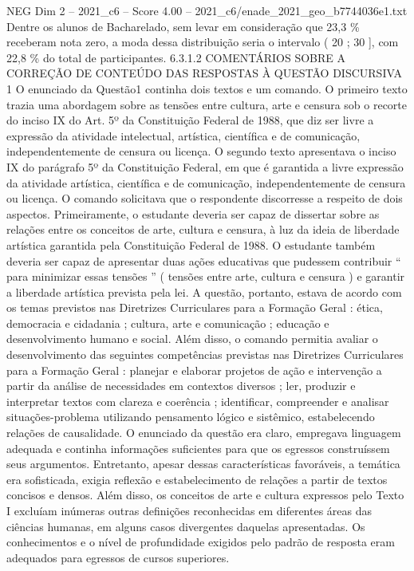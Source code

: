\begin{textsample}{NEG Dim 2 – 2021\_c6 – Score 4.00 – 2021\_c6/enade\_2021\_geo\_b7744036e1.txt}
Dentre os alunos de Bacharelado, sem levar em consideração que 23,3 \% receberam nota zero, a moda dessa distribuição seria o intervalo ( 20 ; 30 ], com 22,8 \% do total de participantes. 6.3.1.2 COMENTÁRIOS SOBRE A CORREÇÃO DE CONTEÚDO DAS RESPOSTAS À QUESTÃO DISCURSIVA 1 O enunciado da Questão1 continha dois textos e um comando.
O primeiro texto trazia uma abordagem sobre as tensões entre cultura, arte e censura sob o recorte do inciso IX do Art. 5º da Constituição Federal de 1988, que diz ser livre a expressão da atividade intelectual, artística, científica e de comunicação, independentemente de censura ou licença.
O segundo texto apresentava o inciso IX do parágrafo 5º da Constituição Federal, em que é garantida a livre expressão da atividade artística, científica e de comunicação, independentemente de censura ou licença.
O comando solicitava que o respondente discorresse a respeito de dois aspectos.
Primeiramente, o estudante deveria ser capaz de dissertar sobre as relações entre os conceitos de arte, cultura e censura, à luz da ideia de liberdade artística garantida pela Constituição Federal de 1988.
O estudante também deveria ser capaz de apresentar duas ações educativas que pudessem contribuir “ para minimizar essas tensões ” ( tensões entre arte, cultura e censura ) e garantir a liberdade artística prevista pela lei.
A questão, portanto, estava de acordo com os temas previstos nas Diretrizes Curriculares para a Formação Geral : ética, democracia e cidadania ; cultura, arte e comunicação ; educação e desenvolvimento humano e social.
Além disso, o comando permitia avaliar o desenvolvimento das seguintes competências previstas nas Diretrizes Curriculares para a Formação Geral : planejar e elaborar projetos de ação e intervenção a partir da análise de necessidades em contextos diversos ; ler, produzir e interpretar textos com clareza e coerência ; identificar, compreender e analisar situações-problema utilizando pensamento lógico e sistêmico, estabelecendo relações de causalidade.
O enunciado da questão era claro, empregava linguagem adequada e continha informações suficientes para que os egressos construíssem seus argumentos.
Entretanto, apesar dessas características favoráveis, a temática era sofisticada, exigia reflexão e estabelecimento de relações a partir de textos concisos e densos.
Além disso, os conceitos de arte e cultura expressos pelo Texto I excluíam inúmeras outras definições reconhecidas em diferentes áreas das ciências humanas, em alguns casos divergentes daquelas apresentadas.
Os conhecimentos e o nível de profundidade exigidos pelo padrão de resposta eram adequados para egressos de cursos superiores.

\end{textsample}
